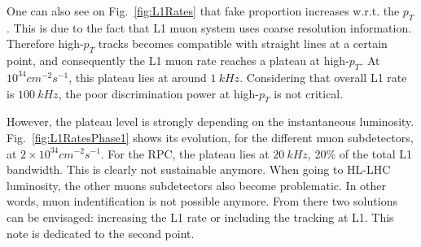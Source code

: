 \noindent One can also see on Fig.~\ref{fig:L1Rates} that fake proportion increases w.r.t. the $p_T$. This is due to the fact that L1 muon system uses coarse resolution information. Therefore high-$p_T$ tracks becomes compatible with straight lines at a certain point, and consequently the L1 muon rate reaches a plateau at high-$p_T$. At $10^{34}cm^{-2}s^{-1}$, this plateau lies at around $1~kHz$. Considering that overall L1 rate is $100~kHz$, the poor discrimination power at high-$p_T$ is not critical.

\noindent However, the plateau level is strongly depending on the instantaneous luminosity. Fig.~\ref{fig:L1RatesPhase1} shows its evolution, for the different muon subdetectors, at $2\times 10^{34}cm^{-2}s^{-1}$. For the RPC, the plateau lies at $20~kHz$, 20\% of the total L1 bandwidth. This is clearly not sustainable anymore. When going to HL-LHC luminosity, the other muons subdetectors also become problematic. In other words, muon indentification is not possible anymore. From there two solutions can be envisaged: increasing the L1 rate or including the tracking at L1. This note is dedicated to the second point.  


\clearpage
